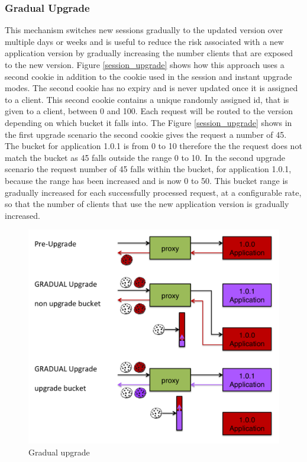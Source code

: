 \documentclass[a4paper,11pt,twoside]{report}
\begin{document}
\subsubsection*{Gradual Upgrade}
This mechanism switches new sessions gradually to the updated version over multiple days or weeks and is useful to reduce the risk associated with a new application version by gradually increasing the number clients that are exposed to the new version. Figure \ref{session_upgrade} shows how this approach uses a second cookie in addition to the cookie used in the session and instant upgrade modes.  The second cookie has no expiry and is never updated once it is assigned to a client.  This second cookie contains a unique randomly assigned id, that is given to a client, between 0 and 100.  Each request will be routed to the version depending on which bucket it falls into.  The Figure \ref{session_upgrade} shows in the first upgrade scenario the second cookie gives the request a number of 45.  The bucket for application 1.0.1 is from 0 to 10 therefore the the request does not match the bucket as 45 falls outside the range 0 to 10.  In the second upgrade scenario the request number of 45 falls within the bucket, for application 1.0.1, because the range has been increased and is now 0 to 50.  This bucket range is gradually increased for each successfully processed request, at a configurable rate, so that the number of clients that use the new application version is gradually increased.

   
\begin{figure}[!ht]
  \centering
     \includegraphics[scale=0.30]{gradual_upgrade}
  \caption{Gradual upgrade}
  \label{gradual_upgrade}
\end{figure}
\end{document}
